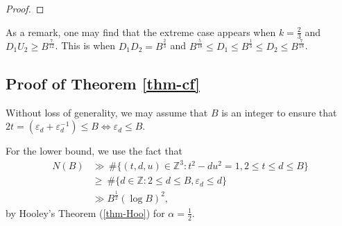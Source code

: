 \documentclass[reqno, 11pt, twoside]{amsart}
\numberwithin{equation}{section}
\theoremstyle{definition}
\renewcommand{\leq}{\leqslant}
\renewcommand{\geq}{\geqslant}
\newcommand{\eps}{\varepsilon}
\newcommand{\ZZ}{\mathbb{Z}}
\begin{document}
\begin{proof}
	
	
	
\end{proof}
As a remark, one may find that the extreme case appears when $k = \frac{2}{3}$ and $D_1 U_2 \geq B^{\frac{7}{12}}$. This is  when $D_1D_2 = B^{\frac{2}{3}}$ and $B^{\frac{5}{18}} \leq D_1 \leq B^{\frac{1}{3}} \leq D_2 \leq B^{\frac{7}{18}}$.

\subsection{Proof of Theorem \ref{thm-cf}}
Without loss of generality, we may assume that $B$ is an integer to ensure that $2t = (\eps_d + \eps_d^{-1}) \leq B \Leftrightarrow \eps_d  \leq B$.

For the lower bound, we use the fact that
        \begin{align*}
            N(B) & \gg \, \# \{ (t,d,u) \in \ZZ^3: t^2 - du^2 = 1, 2 \leq t \leq d \leq B \} \\
            & \geq \ \# \{ d \in \ZZ: 2 \leq d \leq B, \eps_d \leq d \} \\
            & \gg B^\frac{1}{2}(\log B)^2,
        \end{align*}
        by Hooley's Theorem (\ref{thm-Hoo}) for $\alpha = \frac{1}{2}$.
        
\end{document}
